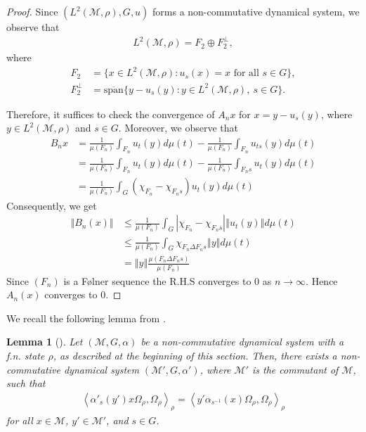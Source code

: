 \documentclass[11pt]{amsart}
\newtheorem{lem}[thm]{Lemma}
\theoremstyle{definition}
\theoremstyle{myremark}
\numberwithin{equation}{section}
\newcommand{\CM}{\mathcal{M}}
\newcommand{\abs}[1]{\left\vert#1\right\vert}
\newcommand{\norm}[1]{\left\Vert#1\right\Vert}
\newcommand\inner[2]{\left\langle #1, #2 \right\rangle}
\begin{document}
		\begin{proof}
			Since $(L^2(\CM, \rho), G, u)$ forms a non-commutative dynamical system, we observe that 
			\begin{align*}
				L^2(\CM, \rho) = F_2 \oplus F_2^\perp,
			\end{align*}
			where 
			\begin{align*}
				F_2 &= \{x \in L^2(\CM, \rho) : u_s(x) = x \text{ for all } s \in G\}, \\
				F_2^\perp &= \overline{\text{span}} \{ y - u_s(y) : y \in L^2(\CM, \rho),~ s \in G \}.
			\end{align*}
			
			Therefore, it suffices to check the convergence of $A_{n}x$ for $x = y - u_s(y)$, where $y \in L^2(\CM, \rho)$ and $s \in G$. Moreover, we observe that
			\begin{align*}
				B_nx &= \frac{1}{\mu(F_n)}\int_{F_n}u_t(y)d\mu(t) - \frac{1}{\mu(F_n)}\int_{F_n}u_{ts}(y)d\mu(t)\\
                &=\frac{1}{\mu(F_n)}\int_{F_n}u_t(y)d\mu(t) - \frac{1}{\mu(F_n)}\int_{F_ns}u_{t}(y)d\mu(t)\\
                &=\frac{1}{\mu(F_n)}\int_{G}(\chi_{F_n}-\chi_{F_ns})u_t(y)d\mu(t)
			\end{align*}
			Consequently, we get
			\begin{align*}
				\norm{B_n(x)} &\leq \frac{1}{\mu(F_n)}\int_{G}\abs{\chi_{F_n}-\chi_{F_ns}}\norm{u_t(y)}d\mu(t)\\
                &\leq \frac{1}{\mu(F_n)}\int_{G}\chi_{F_n \Delta F_ns}\norm{y}d\mu(t)\\
                &=\norm{y} \frac{\mu(F_n \Delta F_ns)}{\mu(F_n)}
			\end{align*}
			Since $(F_n)$ is a F\o lner sequence the R.H.S converges to 0 as $n \rightarrow \infty$. Hence $A_n(x)$ converges to 0.
\end{proof}


        		\noindent We recall the following lemma from \cite{Bik-Dip-neveu}.
		
		\begin{lem}[{\cite[Lemma 4.5]{Bik-Dip-neveu}}] \label{key lem1}
			Let $(\CM,G, \alpha)$ be a non-commutative dynamical system with a f.n. state $\rho$, as described at the beginning of this section. Then, there exists a non-commutative dynamical system $(\CM',G, \alpha')$, where $\CM'$ is the commutant of $\CM$, such that 
			\begin{align*}
				\inner{\alpha'_{s}(y')x \Omega_\rho}{\Omega_\rho}_\rho = \inner{y' \alpha_{s^{-1}}(x) \Omega_\rho}{\Omega_\rho}_\rho
			\end{align*}
			for all $x \in \CM$, $y' \in \CM'$, and $s \in G$.
		\end{lem}
		
\end{document}
